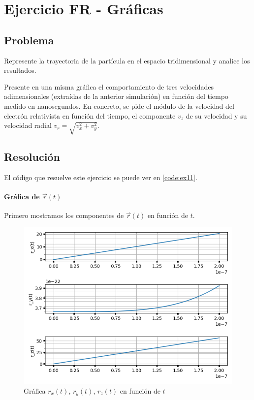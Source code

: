 \section{Ejercicio FR - Gráficas}

\subsection{Problema}

Represente la trayectoria de la partícula en el espacio tridimensional y analice los resultados.

Presente en una misma gráfica el comportamiento de tres velocidades adimensionales (extraídas de la anterior simulación) en función del tiempo medido en nanosegundos. En concreto, se pide el módulo de la velocidad del electrón relativista en función del tiempo, el componente $v_z$ de su velocidad y su velocidad radial $v_r = \sqrt{ v_x^2 + v_y^2}$. 

\subsection{Resolución}

El código que resuelve este ejercicio se puede ver en \ref{code:ex11}.

\paragraph{Gráfica de $\vec{r}(t)$} 
Primero mostramos los componentes de $\vec{r}(t)$ en función de $t$.

\begin{figure}[H]
	\includegraphics[width=\linewidth]{figures/rel_rx_ry_rz.png}
	\caption{Gráfica $r_x(t)$, $r_y(t)$, $r_z(t)$ en función de $t$}
	\label{fig:rel_rx_ry_rz_t}
\end{figure}

